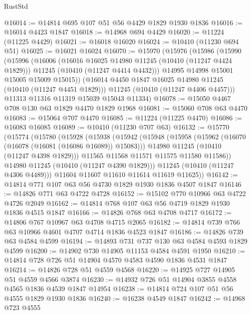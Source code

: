 \begin{lexlean}{RustStd}
\begin{coremodule}
@16014 := @14814 @695 @107 @51 @56 @4429 @1829 @1930 @1836
@16016 := @16014 @4423 @1847
@16018 := @14968 @694 @4429
@16020 := @11224 (@11225 @4429)
@16021 := @16018 @16020
@16024 := @10410 (@11230 @694 @51)
@16025 := @16021 @16024
@16070 := @15970
    (@15976
      (@15986
        (@15990
          (@15996
            (@16006
              (@16016 @16025 @14980 @11245 (@10410 (@11247 @4424 @1829)))
              @11245
              (@10410 (@11247 @4414 @4432)))
            @14995
            @14998
            @15001
            @15005
            @15009
            @15015))
        (@16014 @4450 @1847 @16025 @14980 @11245 (@10410 (@11247 @4451 @1829)))
        @11245
        (@10410 (@11247 @4406 @4457)))
      @11313
      @11316
      @11319
      @15039
      @15043
      @11334)
@16078 := @15050 @4467 @708 @130 @63 @1829 @4470 @1829 @1968
@16081 := @15060 @708 @63 @4470
@16083 := @15064 @707 @4470
@16085 := @11224 (@11225 @4470)
@16086 := @16083 @16085
@16089 := @10410 (@11230 @707 @63)
@16132 := @15770
    (@15774
      (@15780
        (@15928
          (@15938
            (@15942
              (@15948
                (@15958
                  (@15962 (@16070 (@16078 (@16081 (@16086 @16089)) @15083)))
                  @14980
                  @11245
                  (@10410 (@11247 @4398 @1829)))
                @11565
                @11568
                @11571
                @11575
                @11580
                @11586))
            @14980
            @11245
            (@10410 (@11247 @4390 @1829)))
          @11245
          (@10410 (@11247 @4306 @4489)))
        @11604
        @11607
        @11610
        @11614
        @11619
        @11625))
@16142 := @14814 @771 @107 @63 @56 @4730 @1829 @1930 @1836 @4507 @1847
@16146 := @14826 @771 @63 @4722 @4728
@16152 := @15102 @770 @10966 @63 @4722 @4726 @2049
@16162 := @14814 @768 @107 @63 @56 @4719 @1829 @1930 @1836 @4515 @1847
@16166 := @14826 @768 @63 @4708 @4717
@16172 := @14806 @767 @10967 @63 @4708 @4715 @2065
@16182 := @14814 @739 @766 @63 @10966 @4601 @4707 @4714 @1836 @4523 @1847
@16186 := @14826 @739 @63 @4584 @4599
@16194 := @14893 @731 @737 @130 @63 @4584 @4593 @1829 @4599
@16200 := @14902 @730 @14905 @11153 @4584 @4591 @1950
@16210 := @14814 @728 @726 @51 @14904 @4570 @4583 @4590 @1836 @4531 @1847
@16214 := @14826 @728 @51 @4559 @4568
@16220 := @14925 @727 @14905 @51 @4559 @4566 @3874
@16230 := @14932 @726 @51 @14904 @3855 @4558 @4565 @1836 @4539 @1847 @14954
@16238 := @14814 @724 @107 @51 @56 @4555 @1829 @1930 @1836
@16240 := @16238 @4549 @1847
@16242 := @14968 @723 @4555

\end{coremodule}
\end{lexlean}
